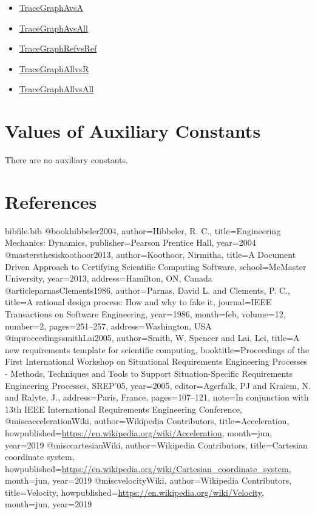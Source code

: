\documentclass[12pt]{article}
\begin{document}
\begin{itemize}
\item{\hyperref{../../../../traceygraphs/dblpendulum/avsa.svg}{}{}{TraceGraphAvsA}}
\item{\hyperref{../../../../traceygraphs/dblpendulum/avsall.svg}{}{}{TraceGraphAvsAll}}
\item{\hyperref{../../../../traceygraphs/dblpendulum/refvsref.svg}{}{}{TraceGraphRefvsRef}}
\item{\hyperref{../../../../traceygraphs/dblpendulum/allvsr.svg}{}{}{TraceGraphAllvsR}}
\item{\hyperref{../../../../traceygraphs/dblpendulum/allvsall.svg}{}{}{TraceGraphAllvsAll}}
\end{itemize}
\section{Values of Auxiliary Constants}
\label{Sec:AuxConstants}
There are no auxiliary constants.

\section{References}
\label{Sec:References}
\begin{filecontents*}{bibfile.bib}
@book{hibbeler2004,
author={Hibbeler, R. C.},
title={Engineering Mechanics: Dynamics},
publisher={Pearson Prentice Hall},
year={2004}}
@mastersthesis{koothoor2013,
author={Koothoor, Nirmitha},
title={A Document Driven Approach to Certifying Scientific Computing Software},
school={McMaster University},
year={2013},
address={Hamilton, ON, Canada}}
@article{parnasClements1986,
author={Parnas, David L. and Clements, P. C.},
title={A rational design process: How and why to fake it},
journal={IEEE Transactions on Software Engineering},
year={1986},
month=feb,
volume={12},
number={2},
pages={251--257},
address={Washington, USA}}
@inproceedings{smithLai2005,
author={Smith, W. Spencer and Lai, Lei},
title={A new requirements template for scientific computing},
booktitle={Proceedings of the First International Workshop on Situational Requirements Engineering Processes - Methods, Techniques and Tools to Support Situation-Specific Requirements Engineering Processes, SREP'05},
year={2005},
editor={Agerfalk, PJ and Kraiem, N. and Ralyte, J.},
address={Paris, France},
pages={107--121},
note={In conjunction with 13th IEEE International Requirements Engineering Conference,}}
@misc{accelerationWiki,
author={Wikipedia Contributors},
title={Acceleration},
howpublished={\url{https://en.wikipedia.org/wiki/Acceleration}},
month=jun,
year={2019}}
@misc{cartesianWiki,
author={Wikipedia Contributors},
title={Cartesian coordinate system},
howpublished={\url{https://en.wikipedia.org/wiki/Cartesian\_coordinate\_system}},
month=jun,
year={2019}}
@misc{velocityWiki,
author={Wikipedia Contributors},
title={Velocity},
howpublished={\url{https://en.wikipedia.org/wiki/Velocity}},
month=jun,
year={2019}}
\end{filecontents*}
\nocite{*}
\printbibliography[heading=none]
\end{document}
